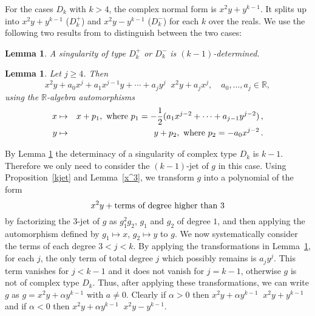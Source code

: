 \documentclass[noend]{amsproc}
\newtheorem{lemma}[theorem]{Lemma}
\DeclareMathOperator{\requiv}{\overset{r}{\sim}}
\begin{document}
For the cases $D_k$ with $k > 4$, the complex normal form is $x^2y+y^{k-1}$. It
splits up into $x^2y+y^{k-1}$ ($D_k^+$) and $x^2y-y^{k-1}$ ($D_k^-$) for each
$k$ over the reals. We use the following two results from \cite{Siersma} to
distinguish between the two cases:

\begin{lemma}\label{kDeterminacyD[k]k>4}
A singularity of type $D_k^+$ or $D_k^-$ is $(k-1)$-determined.
\end{lemma}

\begin{lemma}\label{transformationD[k]}
Let $j\ge 4$. Then
\[
x^2y+a_0x^j+a_1x^{j-1}y+\cdots+a_jy^j\requiv x^2y+a_jx^j,
\quad a_0,\ldots,a_j\in\mathbb R,
\]
using the $\mathbb R$-algebra automorphisms
\begin{eqnarray*}
x&\mapsto&x+p_1,\textnormal{ where }
p_1=-\frac{1}{2}(a_1x^{j-2}+\cdots+a_{j-1}y^{j-2})\,,\\
y&\mapsto&y+p_2,\textnormal{ where } p_2=-a_0x^{j-2} \,.
\end{eqnarray*}
\end{lemma}

By Lemma \ref{kDeterminacyD[k]k>4} the determinacy of a singularity of  complex
type
$D_k$ is $k-1$. Therefore we only need to consider the
$(k-1)$-jet of $g$ in this case. Using Proposition~\ref{kjet} and
Lemma~\ref{x^3}, we transform $g$ into a polynomial of the form
\[x^2y+\textnormal{terms of degree higher than $3$}\]
by factorizing the $3$-jet of $g$ as $g_1^2g_2$, $g_1$ and $g_2$ of
degree $1$,
and then applying the automorphism defined by $g_1\mapsto x$, $g_2\mapsto y$ to
$g$. We
now systematically consider the terms of each degree $3<j<k$. By applying the
transformations in Lemma~\ref{transformationD[k]}, for each $j$, the only term
of total degree $j$ which possibly remains is $a_jy^j$. This term vanishes for
$j<k-1$ and it does not vanish for $j=k-1$, otherwise $g$ is not of complex
type $D_k$. Thus, after applying these transformations,
we can write $g$ as $g=x^2y+\alpha y^{k-1}$ with $a\neq0$. Clearly if
$\alpha>0$ then $x^2y+\alpha y^{k-1}\requiv x^2y+y^{k-1}$ and if $\alpha<0$
then $x^2y+\alpha y^{k-1}\requiv x^2y-y^{k-1}$.
\end{document}
